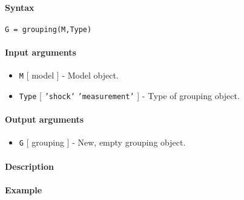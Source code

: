 


	\paragraph{Syntax}

\begin{verbatim}
G = grouping(M,Type)
\end{verbatim}

\paragraph{Input arguments}

\begin{itemize}
\item
  \texttt{M} {[} model {]} - Model object.
\item
  \texttt{Type} {[} \texttt{'shock'} \textbar{} \texttt{'measurement'}
  {]} - Type of grouping object.
\end{itemize}

\paragraph{Output arguments}

\begin{itemize}
\itemsep1pt\parskip0pt
\item
  \texttt{G} {[} grouping {]} - New, empty grouping object.
\end{itemize}

\paragraph{Description}

\paragraph{Example}


